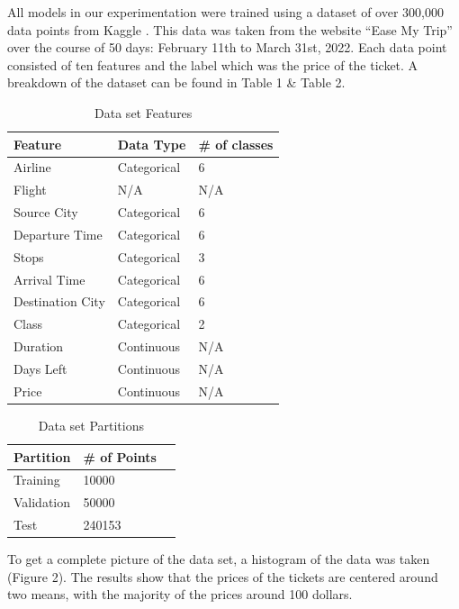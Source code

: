 \documentclass{article}
\begin{document}
All models in our experimentation were trained using a dataset of over 300,000 data points from Kaggle \cite{kaggle}. This data was taken from the website “Ease My Trip” over the course of 50 days: February 11th to March 31st, 2022. Each data point consisted of ten features and the label which was the price of the ticket. A breakdown of the dataset can be found in Table 1 \& Table 2.

\begin{table}[ht]
  \caption{Data set Features}
  \label{sample-table}
  \centering
  \begin{tabular}{lll}
    \toprule
    Feature     & Data Type     & \# of classes \\
    \midrule
    Airline     & Categorical   & 6     \\
    Flight      & N/A   & N/A     \\
    Source City & Categorical   & 6     \\
    Departure Time  & Categorical   & 6     \\
    Stops       & Categorical   & 3     \\
    Arrival Time    & Categorical   & 6     \\
    Destination City    & Categorical   & 6     \\
    Class   & Categorical   & 2     \\
    Duration    & Continuous   & N/A    \\
    Days Left   & Continuous   & N/A     \\
    \midrule
    Price       & Continuous   & N/A     \\

    \bottomrule
  \end{tabular}
\end{table}

\begin{table}[h]
  \caption{Data set Partitions}
  \label{sample-table}
  \centering
  \begin{tabular}{lll}
    \toprule
    Partition       & \# of Points \\
    \midrule
    Training        & 10000 \\
    Validation      & 50000 \\
    Test            & 240153 \\
    \bottomrule
  \end{tabular}
\end{table}

To get a complete picture of the data set, a histogram of the data was taken (Figure 2). The results show that the prices of the tickets are centered around two means, with the majority of the prices around 100 dollars.
\end{document}
